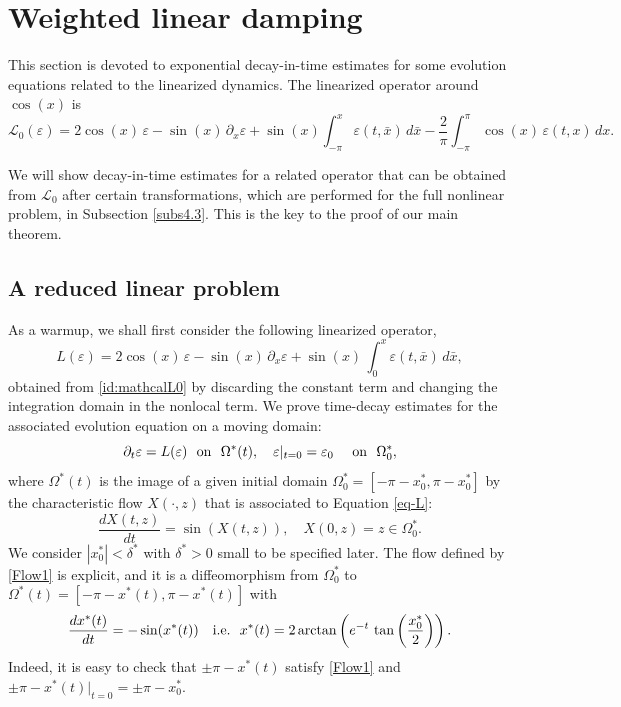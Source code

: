 \documentclass[12pt]{amsart}
\numberwithin{equation}{section}
\let\veps=\varepsilon
\numberwithin{equation}{section}
\newcommand{\cpcomment}[1]{\ \newline\textcolor{darkblue}{+++++++++++++++++++++}\newline
\textcolor{darkblue}{#1}\newline\textcolor{darkblue}{+++++++++++++++++++++}\newline
}
\begin{document}

\section{Weighted linear damping}\label{sec3}
This section is devoted to exponential decay-in-time estimates for some evolution equations related to the linearized dynamics. The linearized operator around $\cos(x)$ is
\begin{equation} \label{id:mathcalL0}
\mathcal{L}_0(\veps)= 2\cos( x) \,\veps -\sin ( x)\,\partial_x \veps +\sin( x) \int_{-\pi}^x \veps(t, \bar x) \,d\bar x - \frac{2}{\pi}  \int_{-\pi}^{\pi}\cos ( x)\, \veps(t,   x)\,dx.
\end{equation}


We will show decay-in-time estimates for a related operator that can be obtained from $\mathcal L_0$ after certain transformations,  {which are performed for the full nonlinear problem, in Subsection \ref{subs4.3}}.     %
This is the key to the proof of our main theorem.   


\subsection{A reduced linear problem}
As a warmup, we shall first consider the following linearized operator,
$$
L(\veps)=2 \cos (x) \,\veps-\sin (x)\, \partial_x \veps + \sin(x)\, \int_0^x \veps(t, \bar x)\,d\bar x,
$$
obtained from \eqref{id:mathcalL0} by discarding the constant term and changing the integration domain in the nonlocal term. We prove time-decay  estimates for the associated evolution equation on a moving domain:
\begin{equation}\label{eq-L}
\partial_t \veps = L(\veps)~~ {\rm on}~~\Omega^*(t),  \quad \veps|_{t=0}= \veps_0~~~~ {\rm on}~~\Omega^*_0,
\end{equation}
where $\Omega^*(t)$ is the image of a  given initial domain $\Omega^*_0=[-\pi-x^*_0, \pi-x^*_0]$  by the characteristic flow ${X(\cdot,  z)}$ that is associated to  Equation \eqref{eq-L}:
\begin{equation}\label{Flow1}
\frac{d X(t, z)}{dt}=\sin(X(t, z)), \quad X(0, z)=z\in \Omega^*_0.
\end{equation}
We consider $|x^*_0|<\delta^*$  with $\delta^*>0$ small to be specified later. The flow defined by \eqref{Flow1} is explicit, and it is a diffeomorphism from $\Omega^*_0$ to $\Omega^*(t)=[-\pi-x^*(t), \pi-x^*(t)]$ with
\begin{equation}\label{def-x*-S3}
\frac{d x^*(t)}{dt}=-\sin(x^*(t))\quad{\rm i.e.}~~x^*(t)=2\arctan\left(    e^{-t}\, \tan\left(\frac{x^*_0}{2}\right)\right).
\end{equation}
Indeed,   it is easy to check that $\pm\pi-x^*(t)$   satisfy \eqref{Flow1} and $\pm\pi-x^*(t)|_{t=0}=\pm\pi-x^*_0.$
\end{document}
